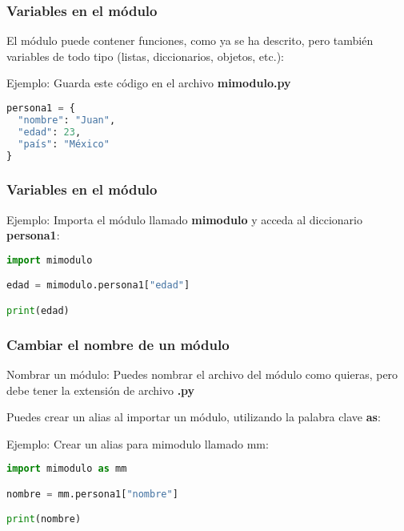 \begin{frame}[fragile]
  \frametitle{Variables en el módulo}

  El módulo puede contener funciones, como ya se ha descrito,
  pero también variables de todo tipo (listas, diccionarios, objetos, etc.):

  \begin{exampleblock}{Ejemplo:}
    Guarda este código en el archivo \textbf{mimodulo.py}
    \begin{lstlisting}[language=Python]
persona1 = {
  "nombre": "Juan",
  "edad": 23,
  "país": "México"
}
    \end{lstlisting}
  \end{exampleblock}
\end{frame}

\begin{frame}[fragile]
  \frametitle{Variables en el módulo}

  \begin{exampleblock}{Ejemplo:}
    Importa el módulo llamado \textbf{mimodulo} y acceda al diccionario
    \textbf{persona1}:
    \begin{lstlisting}[language=Python]
import mimodulo

edad = mimodulo.persona1["edad"]

print(edad)
    \end{lstlisting}
  \end{exampleblock}
\end{frame}

\begin{frame}[fragile]
  \frametitle{Cambiar el nombre de un módulo}

  \begin{block}{Nombrar un módulo:}
    Puedes nombrar el archivo del módulo como quieras,
    pero debe tener la extensión de archivo \textbf{.py}
  \end{block}
  \pausa
  Puedes crear un alias al importar un módulo,
  utilizando la palabra clave \textbf{as}:

  \begin{exampleblock}{Ejemplo:}
    Crear un alias para mimodulo llamado mm:
    \begin{lstlisting}[language=Python]
import mimodulo as mm

nombre = mm.persona1["nombre"]

print(nombre)
    \end{lstlisting}
  \end{exampleblock}
\end{frame}

